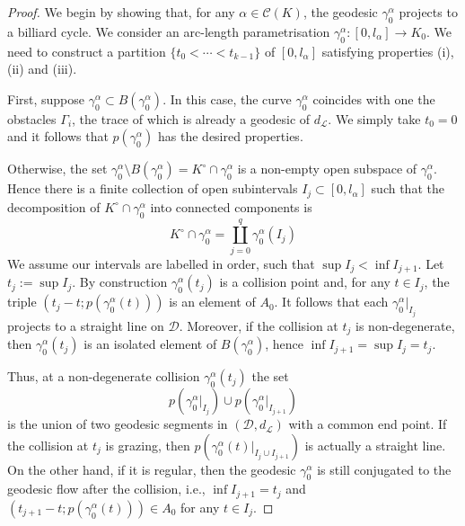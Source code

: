 \documentclass[10pt,a4paper]{amsart}
\begin{document}
\begin{proof}
    \par We begin by showing that, for any \( \alpha \in \mathcal{C}(K) \), the geodesic \( \gamma^\alpha_0 \) projects to a billiard cycle.
    We consider an arc-length parametrisation \( \gamma^\alpha_0\colon [0, l_\alpha] \to K_0 \).
    We need to construct a partition \( \{t_0 < \cdots < t_{k-1}\} \) of \( [0, l_\alpha] \) satisfying properties (i), (ii) and (iii).
    \par First, suppose \( \gamma^\alpha_0 \subset B(\gamma^\alpha_0) \).
    In this case, the curve \( \gamma^\alpha_0 \) coincides with one the obstacles \( \Gamma_i \), the trace of which is already a geodesic of \( d_\mathcal{L} \).
    We simply take \( t_0 = 0 \) and it follows that \( p(\gamma^\alpha_0) \) has the desired properties.
    \par Otherwise, the set \( \gamma^\alpha_0\setminus B(\gamma^\alpha_0) = K^\circ\cap\gamma^\alpha_0 \) is a non-empty open subspace of \( \gamma^\alpha_0\).
    Hence there is a finite collection of open subintervals \(I_j \subset [0, l_\alpha] \) such that the decomposition of  \( K^\circ\cap\gamma^\alpha_0 \) into connected components is
    \[
        K^\circ\cap\gamma^\alpha_0 = \coprod_{j=0}^{q}\gamma^\alpha_0(I_j)
    \]
    We assume our intervals are labelled in order, such that \( \sup I_j < \inf I_{j+1} \).
    Let \( t_j := \sup I_j \). 
    By construction \( \gamma^\alpha_0(t_j) \) is a collision point and, for any \( t \in I_j \), the triple \( (t_j-t; p(\gamma^\alpha_0(t))) \) is an element of \( A_0 \).
    It follows that each \( \gamma^\alpha_0\rvert_{I_j} \) projects to a straight line on \( \mathcal{D} \).
    Moreover, if the collision at \(t_j\) is non-degenerate, then \(\gamma^\alpha_0(t_j)\) is an isolated element of \(B(\gamma^\alpha_0)\), hence \(\inf I_{j+1} = \sup I_j = t_j\).
    \par Thus, at a non-degenerate collision \( \gamma^\alpha_0(t_j) \) the set
    \[
        p(\gamma^\alpha_0\rvert_{I_j})\cup p(\gamma^\alpha_0\rvert_{I_{j+1}})
    \]
    is the union of two geodesic segments in \( (\mathcal{D}, d_\mathcal{L}) \) with a common end point. If the collision at \(t_j\) is grazing, then \( p(\gamma^\alpha_0(t)\rvert_{I_j \cup I_{j+1}}) \) is actually a straight line. 
    On the other hand, if it is regular, then the geodesic \( \gamma^\alpha_0 \) is still conjugated to the geodesic flow after the collision, i.e., \(\inf I_{j+1} = t_j \) and \( (t_{j+1}-t; p(\gamma^\alpha_0(t))) \in A_0 \) for any \( t\in I_j \).

\end{proof}
\end{document}
